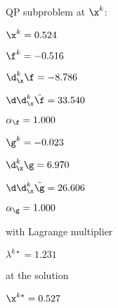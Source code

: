 QP subproblem at $\x^{k}$:

\bigskip
$\x^k=   0.524$


$\f^k =  -0.516$

$\d^k_{\x} \f =  -8.786$

$\d\d^k_{\x} \tilde \f =  33.540$

$\alpha_{\footnotesize\f} =   1.000$

\bigskip
$\g^k =  -0.023$

$\d^k_{\x}\g =   6.970$

$\d\d^k_{\x} \tilde \g =  26.606$

$\alpha_{\footnotesize\g} =   1.000$

\bigskip
with Lagrange multiplier

$\lambda^{k\star} =   1.231$

at the solution

$\x^{k\star} =   0.527$

